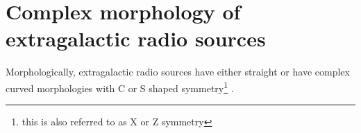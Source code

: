 %
%





\section{Complex morphology of extragalactic radio sources}
Morphologically, extragalactic radio sources have either straight or have complex curved morphologies with C or S shaped symmetry\footnote{this is also referred to as X or Z symmetry} \citep{zaninetti88}. 

